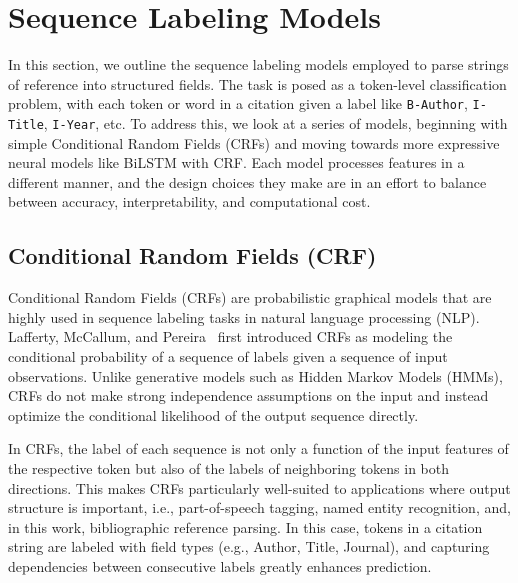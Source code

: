 \section{Sequence Labeling Models}
In this section, we outline the sequence labeling models employed to parse strings of reference into structured fields. The task is posed as a token-level classification problem, with each token or word in a citation given a label like \texttt{B-Author}, \texttt{I-Title}, \texttt{I-Year}, etc. To address this, we look at a series of models, beginning with simple Conditional Random Fields (CRFs) and moving towards more expressive neural models like BiLSTM with CRF. Each model processes features in a different manner, and the design choices they make are in an effort to balance between accuracy, interpretability, and computational cost.
\subsection{Conditional Random Fields (CRF)}
Conditional Random Fields (CRFs) are probabilistic graphical models that are highly used in sequence labeling tasks in natural language processing (NLP). Lafferty, McCallum, and Pereira~\cite{crf2001} first introduced CRFs as modeling the conditional probability of a sequence of labels given a sequence of input observations. Unlike generative models such as Hidden Markov Models (HMMs), CRFs do not make strong independence assumptions on the input and instead optimize the conditional likelihood of the output sequence directly.

In CRFs, the label of each sequence is not only a function of the input features of the respective token but also of the labels of neighboring tokens in both directions. This makes CRFs particularly well-suited to applications where output structure is important, i.e., part-of-speech tagging, named entity recognition, and, in this work, bibliographic reference parsing. In this case, tokens in a citation string are labeled with field types (e.g., Author, Title, Journal), and capturing dependencies between consecutive labels greatly enhances prediction.

